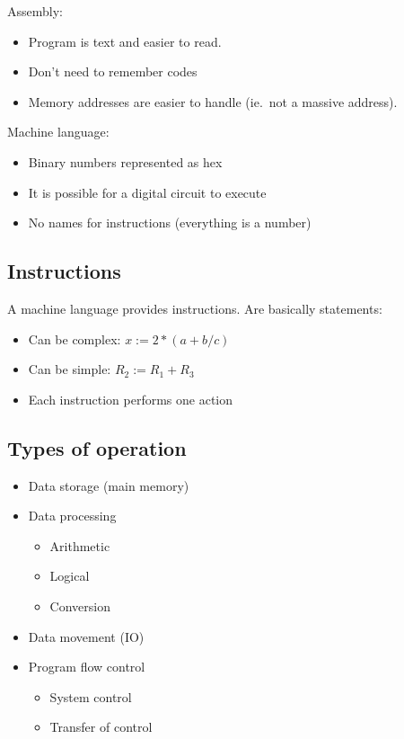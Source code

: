 Assembly:
\begin{itemize}
	\item Program is text and easier to read.
	\item Don't need to remember codes
	\item Memory addresses are easier to handle (ie.\ not a massive address).
\end{itemize}
%
Machine language:
\begin{itemize}
	\item Binary numbers represented as hex
	\item It is possible for a digital circuit to execute
	\item No names for instructions (everything is a number)
\end{itemize}

\subsection{Instructions}\label{sub:instructions}

A machine language provides instructions.
Are basically statements:
\begin{itemize}
	\item Can be complex: \(x:=2*(a+b/c)\)
	\item Can be simple: \(R_2:=R_1 + R_3\)
	\item Each instruction performs one action
\end{itemize}

\subsection{Types of operation}\label{sub:types_of_operation}

\begin{itemize}
	\item Data storage (main memory)
	\item Data processing
	      \begin{itemize}
		      \item Arithmetic
		      \item Logical
		      \item Conversion
	      \end{itemize}
	\item Data movement (IO)
	\item Program flow control
	      \begin{itemize}
		      \item System control
		      \item Transfer of control
	      \end{itemize}
\end{itemize}

